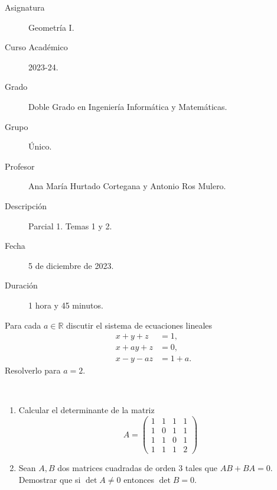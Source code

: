 \documentclass[12pt]{article}
\begin{document}

    
    

    \begin{description}
        \item[Asignatura] Geometría I.
        \item[Curso Académico] 2023-24.
        \item[Grado] Doble Grado en Ingeniería Informática y Matemáticas.
        \item[Grupo] Único.
        \item[Profesor] Ana María Hurtado Cortegana y Antonio Ros Mulero.
        \item[Descripción] Parcial 1. Temas 1 y 2.
        \item[Fecha] 5 de diciembre de 2023.
        \item[Duración] 1 hora y 45 minutos.
    
    \end{description}
    \newpage

    \begin{ejercicio}[3 puntos]
        Para cada $a \in \mathbb{R}$ discutir el sistema de ecuaciones lineales
        \begin{align*}
            x + y + z &= 1, \\
            x + ay + z &= 0, \\
            x - y - az &= 1 + a.
        \end{align*}
        Resolverlo para $a = 2$.
    \end{ejercicio}
        
    \begin{ejercicio} [2 puntos]~
        \begin{enumerate}
            \item Calcular el determinante de la matriz
            \[
            A = \begin{pmatrix}
            1 & 1 & 1 & 1 \\
            1 & 0 & 1 & 1 \\
            1 & 1 & 0 & 1 \\
            1 & 1 & 1 & 2
            \end{pmatrix}
            \]
            \item Sean $A, B$ dos matrices cuadradas de orden $3$ tales que $AB + BA = 0$. Demostrar que si $\det A \neq 0$ entonces $\det B = 0$.
        \end{enumerate}
    \end{ejercicio}
        
\end{document}
